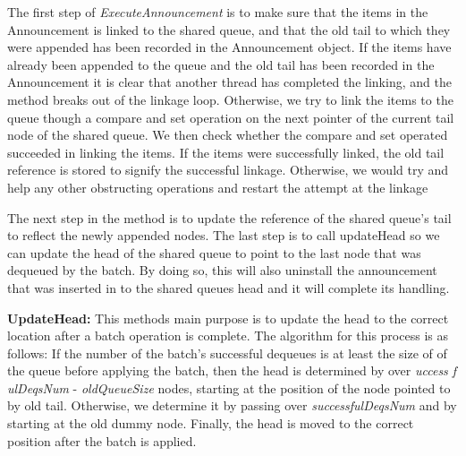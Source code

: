 The first step of \textit{ExecuteAnnouncement} is to make sure that the items in the Announcement is linked to the shared queue, and that the old tail to which they were appended has been recorded in the Announcement object. If the items have already been appended to the queue and the old tail has been recorded in the Announcement it is clear that another thread has completed the linking, and the method breaks out of the linkage loop. Otherwise, we try to link the items to the queue though a compare and set operation on the next pointer of the current tail node of the shared queue. We then check whether the compare and set operated succeeded in linking the items. If the items were successfully linked, the old tail reference is stored to signify the successful linkage. Otherwise, we would try and help any other obstructing operations and restart the attempt at the linkage\newline

The next step in the method is to update the reference of the shared queue’s tail to reflect the newly appended nodes. The last step is to call updateHead so we can update the head of the shared queue to point to the last node that was dequeued by the batch. By doing so, this will also uninstall the announcement that was inserted in to the shared queues head and it will complete its handling.\newline

\textbf{UpdateHead: } This methods main purpose is to update the head to the correct location after a batch operation is complete. The algorithm for this process is as follows: If the number of the batch's successful dequeues is at least the size of of the queue before applying the batch, then the head is determined by over \textit{uccess f ulDeqsNum} - \textit{oldQueueSize} nodes, starting at the position of the node pointed to by old tail. Otherwise, we determine it by passing over \textit{successfulDeqsNum} and by starting at the old dummy node. Finally, the head is moved to the correct position after the batch is applied. 

